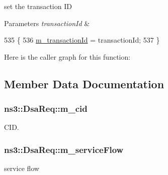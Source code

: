 set the transaction ID 


\begin{DoxyParams}{Parameters}
{\em transaction\+Id} & \\
\hline
\end{DoxyParams}

\begin{DoxyCode}
535 \{
536   \hyperlink{classns3_1_1DsaReq_af9e7af21b5dbab2fa644bbd68a807096}{m\_transactionId} = transactionId;
537 \}
\end{DoxyCode}


Here is the caller graph for this function\+:




\subsection{Member Data Documentation}
\subsubsection[{\texorpdfstring{m\+\_\+cid}{m_cid}}]{ ns3\+::\+Dsa\+Req\+::m\+\_\+cid\hspace{0.3cm}{\ttfamily [private]}}\hypertarget{classns3_1_1DsaReq_a5357229712f7a6be3c95226c06037eb4}{}\label{classns3_1_1DsaReq_a5357229712f7a6be3c95226c06037eb4}


C\+ID. 

\subsubsection[{\texorpdfstring{m\+\_\+service\+Flow}{m_serviceFlow}}]{ ns3\+::\+Dsa\+Req\+::m\+\_\+service\+Flow\hspace{0.3cm}{\ttfamily [private]}}\hypertarget{classns3_1_1DsaReq_ab226e61774135ace5dde5930a7695f09}{}\label{classns3_1_1DsaReq_ab226e61774135ace5dde5930a7695f09}


service flow 

